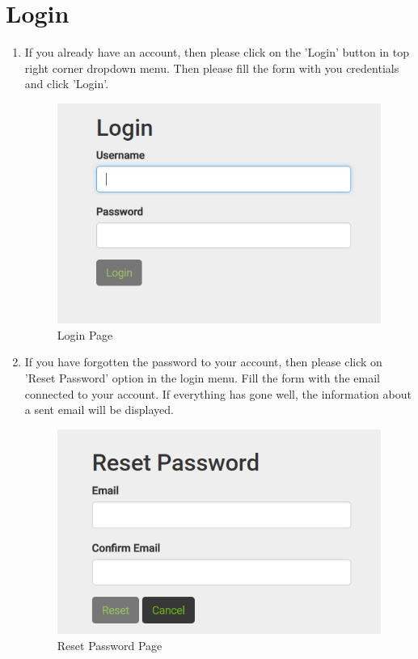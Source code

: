 \documentclass[a4paper,11pt,twoside]{report}
\theoremstyle{definition}
\begin{document}
\section{Login}
\begin{enumerate}
\item If you already have an account, then please click on the 'Login' button in top right corner dropdown menu. Then please fill the form with you credentials and click 'Login'. 

\begin{figure}[h!]
\begin{center}
\includegraphics[width=\textwidth]{AS/login/1}
\end{center}
\caption{Login Page}
\end{figure}

\item If you have forgotten the password to your account, then please click on 'Reset Password' option in the login menu. Fill the form with the email connected to your account. If everything has gone well, the information about a sent email will be displayed.

\begin{figure}[h!]
\begin{center}
\includegraphics[width=\textwidth]{AS/login/4}
\end{center}
\caption{Reset Password Page}
\end{figure}


\end{enumerate}
\end{document}
